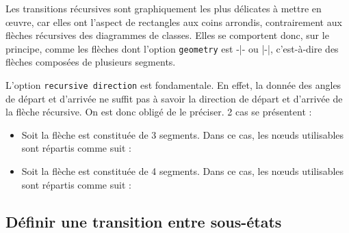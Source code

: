 \documentclass[a4paper,11pt]{report}
\newcommand{\inputTikZ}[1]{%
  }%
\newcommand{\inputTikZ}[1]{%
    \texttt{[image: fig/\#1.pdf]}%
  }%
\begin{document}
Les transitions récursives sont graphiquement les plus délicates à mettre en \oe{}uvre, car elles ont l'aspect de rectangles aux coins arrondis, contrairement aux flèches récursives des diagrammes de classes. Elles se comportent donc, sur le principe, comme les flèches dont l'option {\tt geometry} est -|- ou |-|, c'est-à-dire des flèches composées de plusieurs segments.

\medskip

\begin{minipage}{0.51\textwidth}

\end{minipage}
\begin{minipage}{0.49\textwidth}
\begin{center}
\inputTikZ{transitionrec}
\end{center}
\end{minipage}

\medskip

L'option {\tt recursive direction} est fondamentale. En effet, la donnée des angles de départ et d'arrivée ne suffit pas à savoir la direction de départ et d'arrivée de la flèche récursive. On est donc obligé de le préciser. 2 cas se présentent :

\medskip

\begin{itemize}
\item Soit la flèche est constituée de 3 segments. Dans ce cas, les n\oe{}uds utilisables sont répartis comme suit :

\begin{center}
\inputTikZ{transitionrec-rtr-ptname}
\end{center}

\item Soit la flèche est constituée de 4 segments. Dans ce cas, les n\oe{}uds utilisables sont répartis comme suit :

\medskip

\begin{center}
\inputTikZ{transitionrec-rtb-ptname}
\end{center}

\vspace{-4cm}

\end{itemize}

\subsection{Définir une transition entre sous-états}\label{ss.substatetrans}
\end{document}
